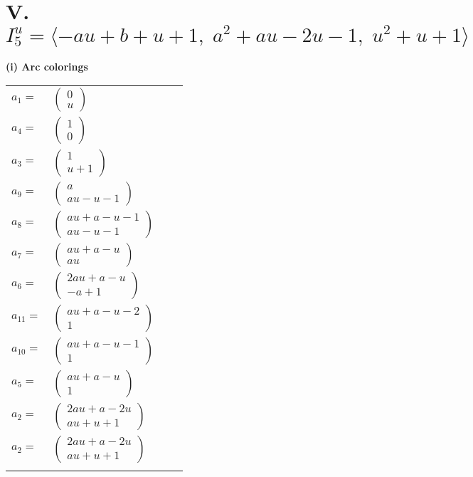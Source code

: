 \documentclass[1p]{elsarticle_modified}
\theoremstyle{definition}
\begin{document}
\centering \section*{V. $I^u_{5}= \langle - a u+b+u+1,\;a^2+a u-2 u-1,\;u^2+u+1 \rangle$}
\flushleft \textbf{(i) Arc colorings}\\
\begin{tabular}{m{7pt} m{180pt} m{7pt} m{180pt} }
\flushright $a_{1}=$&$\begin{pmatrix}0\\u\end{pmatrix}$ \\
\flushright $a_{4}=$&$\begin{pmatrix}1\\0\end{pmatrix}$ \\
\flushright $a_{3}=$&$\begin{pmatrix}1\\u+1\end{pmatrix}$ \\
\flushright $a_{9}=$&$\begin{pmatrix}a\\a u- u-1\end{pmatrix}$ \\
\flushright $a_{8}=$&$\begin{pmatrix}a u+a- u-1\\a u- u-1\end{pmatrix}$ \\
\flushright $a_{7}=$&$\begin{pmatrix}a u+a- u\\a u\end{pmatrix}$ \\
\flushright $a_{6}=$&$\begin{pmatrix}2 a u+a- u\\- a+1\end{pmatrix}$ \\
\flushright $a_{11}=$&$\begin{pmatrix}a u+a- u-2\\1\end{pmatrix}$ \\
\flushright $a_{10}=$&$\begin{pmatrix}a u+a- u-1\\1\end{pmatrix}$ \\
\flushright $a_{5}=$&$\begin{pmatrix}a u+a- u\\1\end{pmatrix}$ \\
\flushright $a_{2}=$&$\begin{pmatrix}2 a u+a-2 u\\a u+u+1\end{pmatrix}$\\ \flushright $a_{2}=$&$\begin{pmatrix}2 a u+a-2 u\\a u+u+1\end{pmatrix}$\\&\end{tabular}
\end{document}

